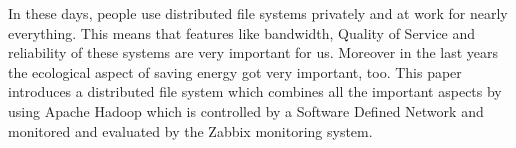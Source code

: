 In these days, people use distributed file systems privately and at work for nearly everything. This means that features like bandwidth, Quality of Service and reliability of these systems are very important for us. Moreover in the last years the ecological aspect of saving energy got very important, too. This paper introduces a distributed file system which combines all the important aspects by using Apache Hadoop\textsuperscript{\textregistered} which is controlled by a Software Defined Network and monitored and evaluated by the Zabbix monitoring system.      